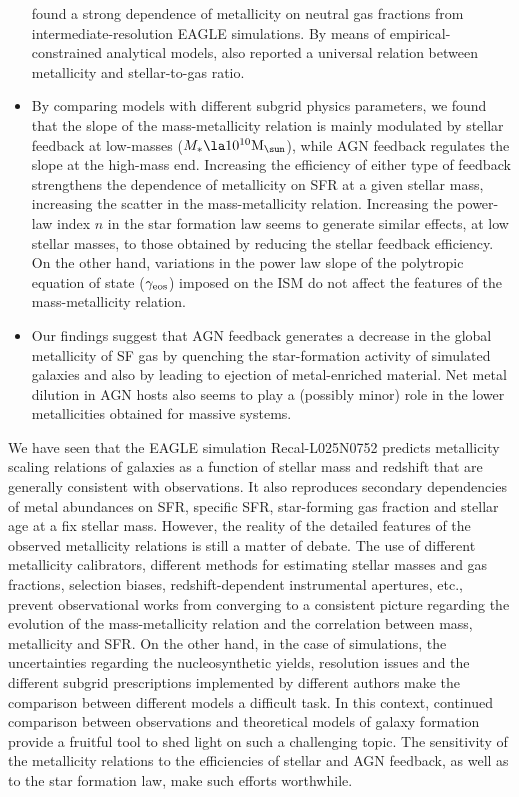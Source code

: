 \documentclass[useAMS,usenatbib]{mn2e}
\begin{document}
\begin{itemize}
\citet{lagos2015} found a 
strong dependence of metallicity on neutral gas fractions from intermediate-resolution {\sc EAGLE} simulations.  
By means of empirical-constrained analytical models, 
\citet{zahid2014a} also reported a universal relation between metallicity and stellar-to-gas ratio.
\item  By comparing models with different subgrid physics parameters, 
we found that the slope
of the mass-metallicity relation is mainly modulated by stellar feedback at low-masses ($M_* \la 10^{10} {\rm M}_{\sun}$),
while AGN feedback regulates the slope at the high-mass end.
Increasing the efficiency of either type of feedback strengthens the dependence of metallicity
on SFR at a given stellar mass, increasing the scatter in the mass-metallicity relation.
Increasing the power-law index $n$ in the star formation law seems to generate similar effects,
at low stellar masses, to those obtained by reducing the stellar feedback efficiency.
On the other hand, variations in the power law slope of the polytropic equation of state
 (${\gamma}_{\rm eos}$) imposed on the ISM do not affect the features of the mass-metallicity relation.
\item Our findings suggest that AGN feedback 
generates a decrease in the global metallicity
of SF gas by quenching the star-formation activity of simulated
galaxies and also by leading to ejection of metal-enriched material. 
Net metal dilution in AGN hosts also seems to play a (possibly minor) role
in the lower metallicities obtained for massive systems.

\end{itemize}


We have seen that the {\sc EAGLE} simulation Recal-L025N0752 predicts metallicity scaling relations of galaxies 
as a function of stellar mass and redshift that are generally consistent with observations.
It also reproduces secondary dependencies of metal abundances on SFR, specific SFR,
star-forming gas fraction and stellar age at a fix stellar mass.
However, the reality of the detailed features of the observed metallicity
relations is still a matter of debate.  The use of different metallicity calibrators,
different methods for estimating stellar masses and gas fractions, selection biases,
redshift-dependent instrumental apertures, etc., prevent observational works from converging
to a consistent picture regarding the evolution of the mass-metallicity relation and the correlation between
mass, metallicity and SFR.
On the other hand, in the case of simulations, the uncertainties regarding the 
nucleosynthetic yields, resolution issues and the different subgrid prescriptions
implemented by different authors make the comparison between different models a difficult task.
In this context, continued comparison between observations and theoretical models
of galaxy formation provide a fruitful tool to  shed light on such a challenging topic.  
The sensitivity of the metallicity relations to the efficiencies of stellar and AGN feedback,
as well as to the star formation law, make such efforts worthwhile.
\end{document}
